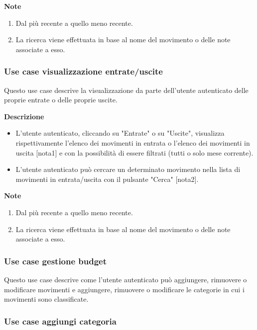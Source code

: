 \documentclass[a4paper,12pt]{article}
\begin{document}
\textbf{Note}
\begin{enumerate} \setlength\itemsep{0.01em}
\item Dal più recente a quello meno recente.
\item La ricerca viene effettuata in base al nome del movimento o delle note associate a esso.
\end{enumerate}



\subsubsection*{Use case visualizzazione entrate/uscite}

Questo use case descrive la visualizzazione da parte dell'utente autenticato delle proprie entrate o delle proprie uscite.

\textbf{Descrizione}
\begin{itemize} \setlength\itemsep{0.01em}
\item L'utente autenticato, cliccando su "Entrate" o su "Uscite", visualizza rispettivamente l'elenco dei movimenti in entrata o l'elenco dei movimenti in uscita [nota1] e con la possibilità di essere filtrati (tutti o solo mese corrente).
\item L'utente autenticato può cercare un determinato movimento nella lista di movimenti in entrata/uscita con il pulsante "Cerca" [nota2].
\end{itemize}

\textbf{Note}
\begin{enumerate} \setlength\itemsep{0.01em}
\item Dal più recente a quello meno recente.
\item La ricerca viene effettuata in base al nome del movimento o delle note associate a esso.
\end{enumerate}




\subsubsection*{Use case gestione budget}

Questo use case descrive come l'utente autenticato può aggiungere, rimuovere o modificare movimenti e aggiungere, rimuovere o modificare le categorie in cui i movimenti sono classificate.


\subsubsection*{Use case aggiungi categoria}
\end{document}

